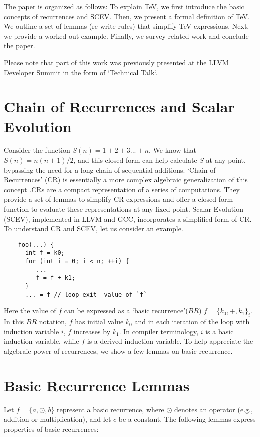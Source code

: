 \documentclass{article}
\begin{document}
The paper is organized as follows: To explain TeV, we first introduce the basic concepts of recurrences
 and SCEV. Then, we present a formal definition of TeV. We outline a set of lemmas (re-write rules)
  that simplify TeV expressions. Next, we provide a worked-out example. Finally, we survey related
   work and conclude the paper.

Please note that part of this work was previously presented at the LLVM Developer
Summit \cite{tev_j} in the form of `Technical Talk`.

\section{Chain of Recurrences and Scalar Evolution}
Consider the function $S(n) = 1+2+3...+n$. We know that $S(n)=n(n+1)/2$, and this closed form can help
 calculate $S$ at any point, bypassing the need for a long chain of sequential additions.
  `Chain of Recurrences' (CR) is essentially a more complex algebraic generalization of this
concept \cite{ZimaRealPaper}.CRs are a compact representation of a series of computations. 
They provide a set of lemmas to simplify CR expressions and offer a closed-form function to evaluate
 these representations at any fixed point. Scalar Evolution (SCEV), implemented in LLVM and GCC,
  incorporates a simplified form of CR. To understand CR and SCEV, let us consider an example.


\begin{verbatim}
    foo(...) { 
      int f = k0;
      for (int i = 0; i < n; ++i) {
         ... 
         f = f + k1;
      }
      ... = f // loop exit  value of `f`
\end{verbatim}

Here the value of $f$ can be expressed as a `basic recurrence'($BR$) $f = \{k_0, +, k_1\}_i$. 
In this $BR$ notation, $f$ has initial value $k_0$ and in each iteration of the loop with 
induction variable $i$, $f$ increases by $k_1$. In compiler terminology, $i$ is a basic 
induction variable, while $f$ is a derived induction variable. To help appreciate the algebraic
 power of recurrences, we show a few lemmas on basic recurrence.
    

\section{Basic Recurrence Lemmas}
Let $f = \{a, \odot, b\}$ represent a basic recurrence, where $\odot$ denotes an operator (e.g., addition or multiplication), and let $c$ be a constant. The following lemmas express  properties of basic recurrences:
    
\end{document}
